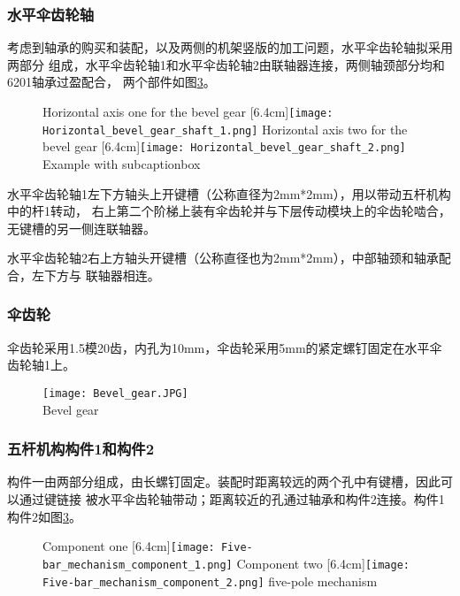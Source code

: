 \subsubsection{水平伞齿轮轴}

考虑到轴承的购买和装配，以及两侧的机架竖版的加工问题，水平伞齿轮轴拟采用两部分
组成，水平伞齿轮轴1和水平伞齿轮轴2由联轴器连接，两侧轴颈部分均和6201轴承过盈配合，
两个部件如图\ref{fig:bisubcaptionbox}。

\begin{figure}[!hbtp]
  \centering
                  {Horizontal axis one for the bevel gear}%
                  [6.4cm]{\texttt{[image: Horizontal\_bevel\_gear\_shaft\_1.png]}}
  \hspace{1cm}
                  {Horizontal axis two for the bevel gear}%
                  [6.4cm]{\texttt{[image: Horizontal\_bevel\_gear\_shaft\_2.png]}}
            {Example with subcaptionbox}
  \label{fig:bisubcaptionbox}
\end{figure}

水平伞齿轮轴1左下方轴头上开键槽（公称直径为2mm*2mm），用以带动五杆机构中的杆1转动，
右上第二个阶梯上装有伞齿轮并与下层传动模块上的伞齿轮啮合，无键槽的另一侧连联轴器。


水平伞齿轮轴2右上方轴头开键槽（公称直径也为2mm*2mm），中部轴颈和轴承配合，左下方与
联轴器相连。

\subsubsection{伞齿轮}
伞齿轮采用1.5模20齿，内孔为10mm，伞齿轮采用5mm的紧定螺钉固定在水平伞齿轮轴1上。
\begin{figure}[!htp]
  \centering
  \texttt{[image: Bevel\_gear.JPG]} \\
    {Bevel gear}
  \label{fig:伞齿轮}
\end{figure}

\subsubsection{五杆机构构件1和构件2}

构件一由两部分组成，由长螺钉固定。装配时距离较远的两个孔中有键槽，因此可以通过键链接
被水平伞齿轮轴带动；距离较近的孔通过轴承和构件2连接。构件1构件2如图\ref{fig:bisubcaptionbox}。

\begin{figure}[!hbtp]
  \centering
                  {Component one}%
                  [6.4cm]{\texttt{[image: Five-bar\_mechanism\_component\_1.png]}}
  \hspace{1cm}
                  {Component two}%
                  [6.4cm]{\texttt{[image: Five-bar\_mechanism\_component\_2.png]}}
            {five-pole mechanism}
  \label{fig:bisubcaptionbox}
\end{figure}


